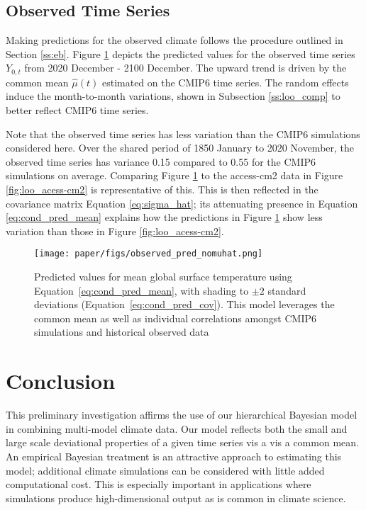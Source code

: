 \documentclass{CUP-JNL-EDS}
\begin{document}
\subsection{Observed Time Series}
Making predictions for the observed climate follows the procedure outlined in Section \ref{ss:eb}. Figure \ref{fig:observed_pred} depicts the predicted values for the observed time series $Y_{0,t}$ from 2020 December - 2100 December. The upward trend is driven by the common mean $\hat{\mu}(t)$ estimated on the CMIP6 time series. The random effects induce the month-to-month variations, shown in Subsection \ref{ss:loo_comp} to better reflect CMIP6 time series. 

Note that the observed time series has less variation than the CMIP6 simulations considered here. Over the shared period of 1850 January to 2020 November, the observed time series has variance 0.15 compared to 0.55 for the CMIP6 simulations on average. Comparing Figure \ref{fig:observed_pred} to the access-cm2 data in Figure \ref{fig:loo_acess-cm2} is representative of this. This is then reflected in the covariance matrix Equation \ref{eq:sigma_hat}; its attenuating presence in Equation \ref{eq:cond_pred_mean} explains how the predictions in Figure \ref{fig:observed_pred} show less variation than those in Figure \ref{fig:loo_acess-cm2}.

\begin{figure}[h]
    \centering
    \texttt{[image: paper/figs/observed\_pred\_nomuhat.png]}
    \caption{Predicted values for mean global surface temperature using Equation~\ref{eq:cond_pred_mean}, with shading to $\pm 2$ standard deviations (Equation~\ref{eq:cond_pred_cov}). This model leverages the common mean as well as individual correlations amongst CMIP6 simulations and historical observed data}
    \label{fig:observed_pred}
\end{figure}


\section{Conclusion}
This preliminary investigation affirms the use of our hierarchical Bayesian model in combining multi-model climate data. Our model reflects both the small and large scale deviational properties of a given time series vis a vis a common mean. An empirical Bayesian treatment is an attractive approach to estimating this model; additional climate simulations can be considered with little added computational cost. This is especially important in applications where simulations produce high-dimensional output as is common in climate science.
\end{document}
